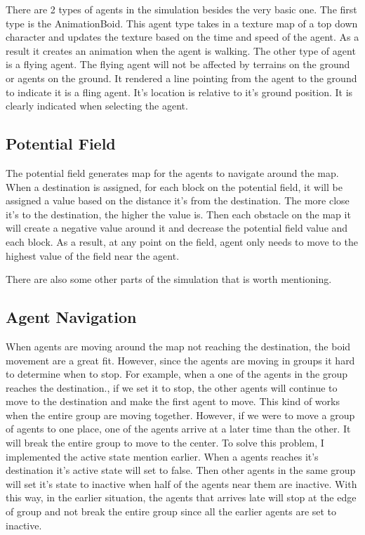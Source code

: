 \documentclass[letterpaper, 12pt]{article}
\begin{document}
There are 2 types of agents in the simulation besides the very basic one. The first type is the AnimationBoid. This agent type takes in a texture map of a top down character and updates the texture based on the time and speed of the agent. As a result it creates an animation when the agent is walking. The other type of agent is a flying agent. The flying agent will not be affected by terrains on the ground or agents on the ground. It rendered a line pointing from the agent to the ground to indicate it is a fling agent. It's location is relative to it's ground position. It is clearly indicated when selecting the agent. 


\subsection*{Potential Field}
The potential field generates map for the agents to navigate around the map. When a destination is assigned, for each block on the potential field, it will be assigned a value based on the distance it's from the destination. The more close it's to the destination, the higher the value is. Then each obstacle on the map it will create a negative value around it and decrease the potential field value and each block. As a result, at any point on the field, agent only needs to move to the highest value of the field near the agent. 

There are also some other parts of the simulation that is worth mentioning. 
\subsection*{Agent Navigation}
When agents are moving around the map not reaching the destination, the boid movement are a great fit. However, since the agents are moving in groups it hard to determine when to stop. For example, when a one of the agents in the group reaches the destination., if we set it to stop, the other agents will continue to move to the destination and make the first agent to move. This kind of works when the entire group are moving together. However, if we were to move a group of agents to one place, one of the agents arrive at a later time than the other. It will break the entire group to move to the center. To solve this problem, I implemented the active state mention earlier. When a agents reaches it's destination it's active state will set to false. Then other agents in the same group will set it's state to inactive when half of the agents near them are inactive. With this way, in the earlier situation, the agents that arrives late will stop at the edge of group and not break the entire group since all the earlier agents are set to inactive. 
\end{document}
